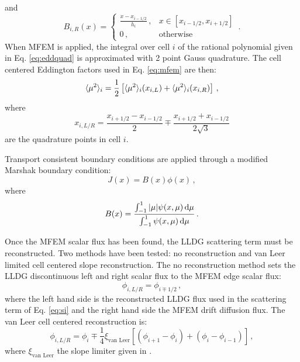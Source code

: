 and 
	\begin{equation}
		B_{i,R}(x) = \begin{cases}
			\frac{x - x_{i-1/2}}{h_i} \,, & x \in [x_{i-1/2}, x_{i+1/2}] \\ 
			0 \,, & \text{otherwise}
		\end{cases} \,.
	\end{equation}
When MFEM is applied, the integral over cell $i$ of the rational polynomial given in Eq. \ref{eq:eddquad} is approximated with 2 point Gauss quadrature. The cell centered Eddington factors used in Eq. \ref{eq:mfem} are then: 
	\begin{equation} 
		\langle \mu^2 \rangle_i = \frac{1}{2} \left[ \langle \mu^2 \rangle_i(x_{i,L}) + \langle \mu^2 \rangle_i(x_{i,R}) \right] \,,
	\end{equation}
where 
	\begin{equation}
		x_{i,L/R} = \frac{x_{i+1/2} - x_{i-1/2}}{2} \mp \frac{x_{i+1/2} + x_{i-1/2}}{2\sqrt{3}}
	\end{equation}
are the quadrature points in cell $i$. 

Transport consistent boundary conditions are applied through a modified Marshak boundary condition: 
	\begin{equation} 
		J(x) = B(x) \phi(x) \,,
	\end{equation} 
where 
	\begin{equation} 
		B(x) = \frac{\int_{-1}^1 |\mu| \psi(x, \mu) \mathop{}\!\mathrm{d} \mu}
		{\int_{-1}^1 \psi(x, \mu) \mathop{}\!\mathrm{d} \mu} \,. 
	\end{equation}

Once the MFEM scalar flux has been found, the LLDG scattering term must be reconstructed. Two methods have been tested: no reconstruction and van Leer limited cell centered slope reconstruction. The no reconstruction method sets the LLDG discontinuous left and right scalar flux to the MFEM edge scalar flux: 
	\begin{equation} 
		\phi_{i,L/R} = \phi_{i\mp1/2} \,,
	\end{equation} 
where the left hand side is the reconstructed LLDG flux used in the scattering term of Eq. \ref{eq:si} and the right hand side the MFEM drift diffusion flux. The van Leer cell centered reconstruction is: 
	\begin{equation} 
		\phi_{i,L/R} = \phi_i \mp \frac{1}{4} \xi_\text{van Leer} \left[\left(\phi_{i+1} - \phi_i\right) + \left(\phi_i - \phi_{i-1}\right) \right] \,,
	\end{equation}
where $\xi_\text{van Leer}$ the slope limiter given in \cite{vanLeer}. 
